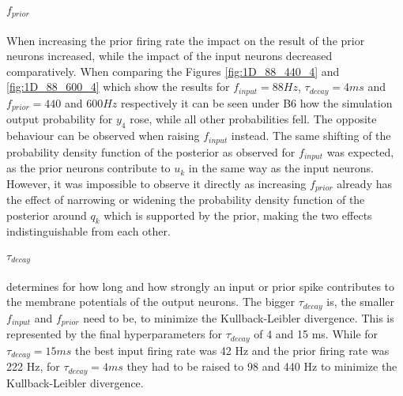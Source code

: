 \paragraph{$f_{prior}$} When increasing the prior firing rate the impact on the result of the prior neurons increased, while the impact of the input neurons decreased comparatively. When comparing the Figures \ref{fig:1D_88_440_4} and \ref{fig:1D_88_600_4} which show the results for $f_{input} = 88 Hz$, $\tau_{decay} = 4 ms$ and $f_{prior} = 440$ and $600 Hz$ respectively it can be seen under B6 how the simulation output probability for $y_4$ rose, while all other probabilities fell. The opposite behaviour can be observed when raising $f_{input}$ instead. The same shifting of the probability density function of the posterior as observed for $f_{input}$ was expected, as the prior neurons contribute to $u_k$ in the same way as the input neurons. However, it was impossible to observe it directly as increasing $f_{prior}$ already has the effect of narrowing or widening the probability density function of the posterior around $q_k$ which is supported by the prior, making the two effects indistinguishable from each other.

\paragraph{$\tau_{decay}$} determines for how long and how strongly an input or prior spike contributes to the membrane potentials of the output neurons. The bigger $\tau_{decay}$ is, the smaller $f_{input}$ and $f_{prior}$ need to be, to minimize the Kullback-Leibler divergence. This is represented by the final hyperparameters for $\tau_{decay}$ of 4 and 15 ms. While for $\tau_{decay} = 15 ms$ the best input firing rate was 42 Hz and the prior firing rate was 222 Hz, for $\tau_{decay} = 4 ms$ they had to be raised to 98 and 440 Hz to minimize the Kullback-Leibler divergence.

